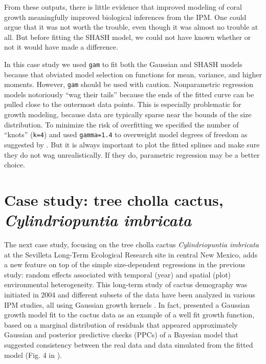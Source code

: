 \documentclass[12pt]{article}
\begin{document}
From these outputs, there is little evidence that improved modeling of coral growth meaningfully improved biological inferences from the IPM. 
One could argue that it was not worth the trouble, even though it was almost no trouble at all. But before 
fitting the SHASH model, we could not have known whether or not it would have made a difference.

In this case study we used \texttt{gam} to fit both the Gaussian and SHASH models because that obviated model selection on functions for mean, variance, and higher moments. 
However, \texttt{gam} should be used with caution. 
Nonparametric regression models notoriously ``wag their tails'' because the ends of the fitted curve can be pulled close to the outermost data points. 
This is especially problematic for growth modeling, because data are typically sparse near the bounds of the size distribution. 
To minimize the risk of overfitting we specified the number of ``knots'' (\texttt{k=4}) and used \texttt{gamma=1.4} to overweight model degrees of freedom as suggested by \citet[][sec. 3.2]{gu-2013}. 
But it is always important to plot the fitted splines and make sure they do not wag unrealistically. 
If they do, parametric regression may be a better choice. 

\section{Case study: tree cholla cactus, \emph{Cylindriopuntia imbricata}}
The next case study, focusing on the tree cholla cactus \emph{Cylindriopuntia imbricata} at the Sevilleta Long-Term Ecological Research site in central New Mexico, adds a new feature on top of the simple size-dependent regressions in the previous study: random effects associated with temporal (year) and spatial (plot) environmental heterogeneity. 
This long-term study of cactus demography was initiated in 2004 and different subsets of the data have been analyzed in various IPM studies, all using Gaussian growth kernels  \citep{miller2009impacts,czachurademographic,compagnoni2016effect,ohm2014balancing,elderd2016quantifying}.
In fact, \citep{elderd2016quantifying} presented a Gaussian growth model fit to the cactus data as an example of a well fit growth function, based on a marginal distribution of residuals that appeared approximately Gaussian and posterior predictive checks (PPCs) of a Bayesian model that suggested consistency between the real data and data simulated from the fitted model (Fig. 4 in \citep{elderd2016quantifying}). 
\end{document}

